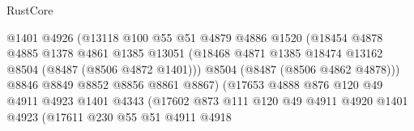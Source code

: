 \begin{lexlean}{RustCore}
\begin{coremodule}
                                      @1401
                                      @4926
                                      (@13118
                                        @100
                                        @55
                                        @51
                                        @4879
                                        @4886
                                        @1520
                                        (@18454
                                          @4878
                                          @4885
                                          @1378
                                          @4861
                                          @1385
                                          @13051
                                          (@18468
                                            @4871
                                            @1385
                                            @18474
                                            @13162
                                            @8504
                                            (@8487 (@8506 @4872 @1401)))
                                          @8504
                                          (@8487 (@8506 @4862 @4878)))
                                        @8846
                                        @8849
                                        @8852
                                        @8856
                                        @8861
                                        @8867)
                                      (@17653
                                        @4888
                                        @876
                                        @120
                                        @49
                                        @4911
                                        @4923
                                        @1401
                                        @4343
                                        (@17602
                                          @873
                                          @111
                                          @120
                                          @49
                                          @4911
                                          @4920
                                          @1401
                                          @4923
                                          (@17611
                                            @230
                                            @55
                                            @51
                                            @4911
                                            @4918

\end{coremodule}
\end{lexlean}
